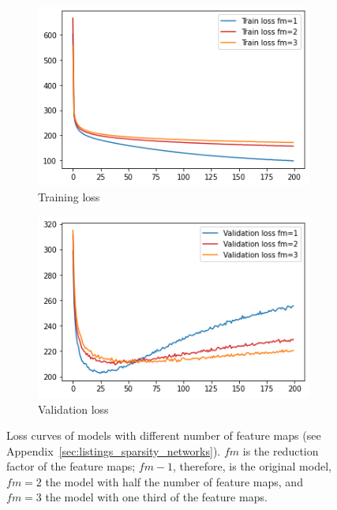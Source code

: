 \begin{figure}
    \centering
    \begin{subfigure}{.45\textwidth}
        \centering
        \includegraphics[width=\textwidth]{images/sparseness/sparseness_train_loss.png}
        \caption{Training loss}
    \end{subfigure}
    \hfill
    \begin{subfigure}{.45\textwidth}
        \centering
        \includegraphics[width=\textwidth]{images/sparseness/sparseness_validation_loss.png}
        \caption{Validation loss}
    \end{subfigure}
    \caption{Loss curves of models with different number of feature maps (see Appendix~\ref{sec:listings_sparsity_networks}). $fm$ is the reduction factor of the feature maps; $fm-1$, therefore, is the original model, $fm=2$ the model with half the number of feature maps, and $fm=3$ the model with one third of the feature maps.}
    \label{fig:learning_curves_sparseness}
\end{figure}

